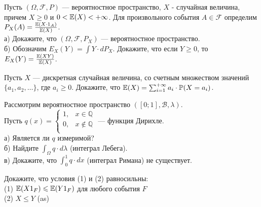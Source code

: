 \begin{solution}
\begin{solution}
\begin{solution}
\begin{solution}
\begin{solution}
\begin{problem}
Пусть $(\Omega,\mathcal{F},P)$ --- вероятностное пространство, $X$ -
случайная величина, причем $X\ge 0$ и $0<\mathbb{E}(X)< + \infty$. Для
произвольного события $A\in\mathcal{F}$ определим
$P_{X}(A)=\frac{\mathbb{E}(X\cdot 1_{A})}{\mathbb{E}(X)}$. \\
а) Докажите, что $(\Omega,\mathcal{F},P_{X})$ --- вероятностное пространство. \\
б) Обозначим $E_{X}(Y)=\int Y \cdot dP_{X}$. Докажите, что
если $Y\ge 0$, то $E_{X}(Y)=\frac{\mathbb{E}(XY)}{\mathbb{E}(X)}$. 
\end{problem} 
\begin{solution} 

\end{solution}

\begin{problem}
Пусть $X$ --- дискретная случайная величина, со счетным множеством
значений $\{a_{1},a_{2},\ldots\}$, где $a_{i} \ge 0$. Докажите, что
$\mathbb{E}(X)=\sum_{i=1}^{+\infty} a_{i}\cdot \mathbb{P}(X=a_{i})$. 
\end{problem} 
\begin{solution} 

\end{solution}

\begin{problem}
Рассмотрим вероятностное пространство
$([0;1],\mathcal{B},\lambda)$. \\
Пусть $q(x)= 
\begin{cases}
  1, & x\in \mathbb{Q} \\
  0, & x\notin \mathbb{Q} \\
\end{cases}$ --- функция Дирихле. \\
а) Является ли $q$ измеримой? \\
б) Найдите $\int_{\Omega}q \cdot d\lambda$ (интеграл Лебега). \\
в) Докажите, что $\int_{0}^{1} q \cdot dx$ (интеграл Римана) не
существует. 
\end{problem} 
\begin{solution} 

\end{solution}

\begin{problem}
Докажите, что условия (1) и (2) равносильны: \\
(1) $\mathbb{E}(X 1_{F})\leqslant \mathbb{E}(Y 1_{F})$ для любого события $F$ \\
(2) $X\le Y$ (as) 
\end{problem} 
\begin{solution} 



\end{solution}
\end{solution}
\end{solution}
\end{solution}
\end{solution}
\end{solution}
